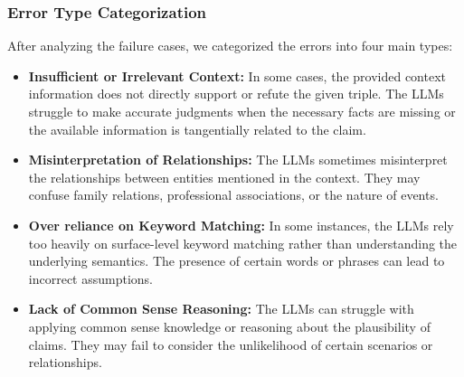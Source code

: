 \subsubsection{Error Type Categorization}
After analyzing the failure cases, we categorized the errors into four main types:
\begin{itemize}
    \item \textbf{Insufficient or Irrelevant Context:} In some cases, the provided context information does not directly support or refute the given triple. The LLMs struggle to make accurate judgments when the necessary facts are missing or the available information is tangentially related to the claim.
    \item \textbf{Misinterpretation of Relationships:} The LLMs sometimes misinterpret the relationships between entities mentioned in the context. They may confuse family relations, professional associations, or the nature of events.
    \item \textbf{Over reliance on Keyword Matching:} In some instances, the LLMs rely too heavily on surface-level keyword matching rather than understanding the underlying semantics. The presence of certain words or phrases can lead to incorrect assumptions.
    \item \textbf{Lack of Common Sense Reasoning:} The LLMs can struggle with applying common sense knowledge or reasoning about the plausibility of claims. They may fail to consider the unlikelihood of certain scenarios or relationships.
\end{itemize}

